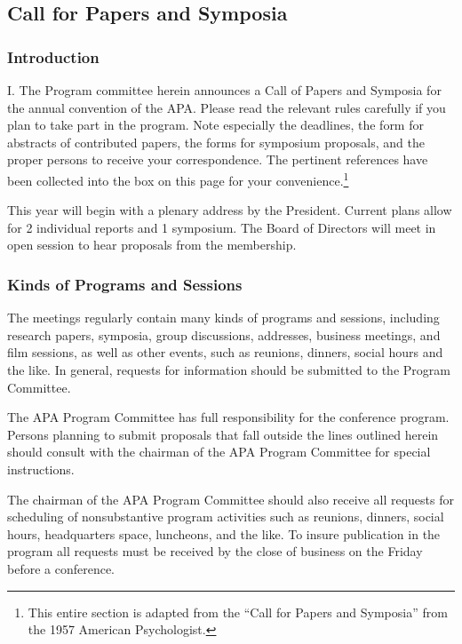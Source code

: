 \subsection{Call for Papers and Symposia}
\label{callforpapersandsymposia}

\subsubsection{Introduction}
\label{introduction}

I. The Program committee herein announces a Call of Papers and Symposia for the annual convention of the APA. Please read the relevant rules carefully if you plan to take part in the program. Note especially the deadlines, the form for abstracts of contributed papers, the forms for symposium proposals, and the proper persons to receive your correspondence. The pertinent references have been collected into the box on this page for your convenience.\footnote{This entire section is adapted from the “Call for Papers and Symposia” from the 1957 American Psychologist.}

This year will begin with a plenary address by the President. Current plans allow for 2 individual reports and 1 symposium. The Board of Directors will meet in open session to hear proposals from the membership.

\subsubsection{Kinds of Programs and Sessions}
\label{kindsofprogramsandsessions}

The meetings regularly contain many kinds of programs and sessions, including research papers, symposia, group discussions, addresses, business meetings, and film sessions, as well as other events, such as reunions, dinners, social hours and the like. In general, requests for information should be submitted to the Program Committee.

The APA Program Committee has full responsibility for the conference program. Persons planning to submit proposals that fall outside the lines outlined herein should consult with the chairman of the APA Program Committee for special instructions.

The chairman of the APA Program Committee should also receive all requests for scheduling of nonsubstantive program activities such as reunions, dinners, social hours, headquarters space, luncheons, and the like. To insure publication in the program all requests must be received by the close of business on the Friday before a conference.

